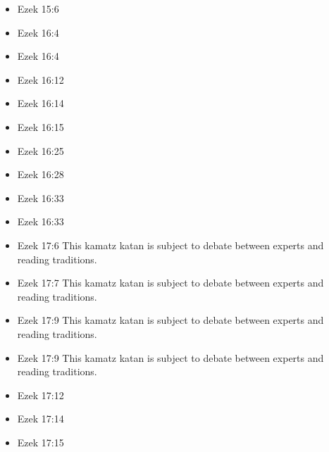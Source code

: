 \documentclass[14pt]{article}
\begin{document}
\begin{multicols}{2}
\begin{itemize}
										\item Ezek 15:6
										
										\item Ezek 16:4
										
										\item Ezek 16:4
										
										\item Ezek 16:12
										
										\item Ezek 16:14
										
										\item Ezek 16:15
										
										\item Ezek 16:25
										
										\item Ezek 16:28
										
										\item Ezek 16:33
										
										\item Ezek 16:33
										
										\item Ezek 17:6 This kamatz katan is subject to debate between experts and reading traditions.
										
										\item Ezek 17:7 This kamatz katan is subject to debate between experts and reading traditions.
										
										\item Ezek 17:9 This kamatz katan is subject to debate between experts and reading traditions.
										
										\item Ezek 17:9 This kamatz katan is subject to debate between experts and reading traditions.
										
										\item Ezek 17:12
										
										\item Ezek 17:14
										
										\item Ezek 17:15
										

\end{itemize}
\end{multicols}
\end{document}

